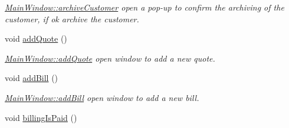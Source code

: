 \begin{DoxyCompactItemize}
\begin{DoxyCompactList}\small\item\em \hyperlink{classGui_1_1MainWindow_a8fb7964262a931657329a4c13afb2dad}{Main\-Window\-::archive\-Customer} open a pop-\/up to confirm the archiving of the customer, if ok archive the customer. \end{DoxyCompactList}\item 
void \hyperlink{classGui_1_1MainWindow_aa7d3f2553b55d74885ad7f19ed403dfd}{add\-Quote} ()
\begin{DoxyCompactList}\small\item\em \hyperlink{classGui_1_1MainWindow_aa7d3f2553b55d74885ad7f19ed403dfd}{Main\-Window\-::add\-Quote} open window to add a new quote. \end{DoxyCompactList}\item 
void \hyperlink{classGui_1_1MainWindow_a4b9d5d9bee4b7a5f7d8cfe04d1222315}{add\-Bill} ()
\begin{DoxyCompactList}\small\item\em \hyperlink{classGui_1_1MainWindow_a4b9d5d9bee4b7a5f7d8cfe04d1222315}{Main\-Window\-::add\-Bill} open window to add a new bill. \end{DoxyCompactList}\item 
\hypertarget{classGui_1_1MainWindow_a149c8e2210fa249c0510e1f607079fde}{void \hyperlink{classGui_1_1MainWindow_a149c8e2210fa249c0510e1f607079fde}{billing\-Is\-Paid} ()}\label{classGui_1_1MainWindow_a149c8e2210fa249c0510e1f607079fde}


\end{DoxyCompactItemize}
